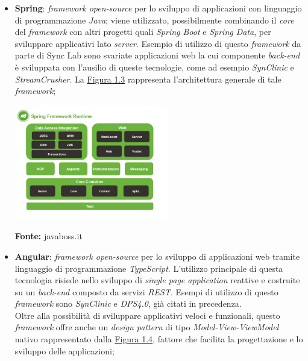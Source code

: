 \begin{itemize}
  \item \textbf{Spring}: \textit{framework open-source} per lo sviluppo di applicazioni con linguaggio di programmazione \textit{Java}; viene utilizzato, possibilmente combinando il \textit{core} del \textit{framework} con altri progetti quali \textit{Spring Boot} e \textit{Spring Data}, per sviluppare applicativi lato \textit{server}. Esempio di utilizzo di questo \textit{framework} da parte di Sync Lab sono svariate applicazioni web la cui componente \textit{back-end} è sviluppata con l'ausilio di queste tecnologie, come ad esempio \textit{SynClinic} e \textit{StreamCrusher}. La \hyperref[img:spring]{Figura 1.3} rappresenta l'architettura generale di tale \textit{framework};

  \begin{minipage}{\linewidth}
    \label{img:spring}
    \centering
      \includegraphics[height=5cm]{immagini/spring}
    \caption*{\textbf{Fonte:} javaboss.it}
  \end{minipage}

  \item \textbf{Angular}: \textit{framework open-source} per lo sviluppo di applicazioni web tramite linguaggio di programmazione \textit{TypeScript}. L'utilizzo principale di questa tecnologia risiede nello sviluppo di \textit{single page application} reattive e costruite su un \textit{back-end} composto da servizi \textit{REST}. Esempi di utilizzo di questo \textit{framework} sono \textit{SynClinic} e \textit{DPS4.0}, già citati in precedenza. \\
  Oltre alla possibilità di sviluppare applicativi veloci e funzionali, questo \textit{framework} offre anche un \textit{design pattern} di tipo \textit{Model-View-ViewModel} nativo rappresentato dalla \hyperref[img:angular]{Figura 1.4}, fattore che facilita la progettazione e lo sviluppo delle applicazioni;


\end{itemize}
